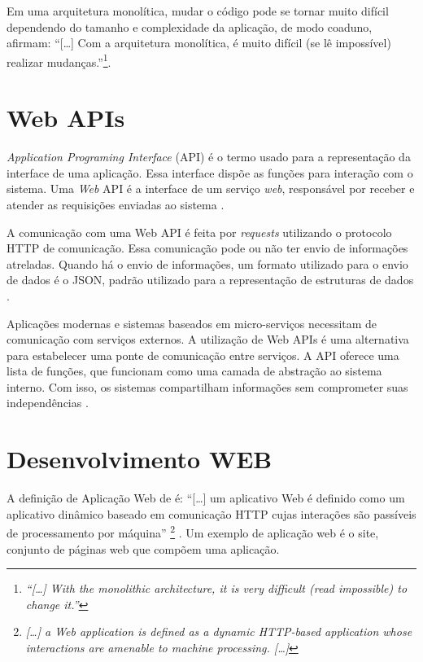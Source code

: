 Em uma arquitetura monolítica, mudar o código pode se tornar muito difícil dependendo do tamanho e complexidade da aplicação, de modo coaduno,  afirmam: ``[\dots] Com a arquitetura monolítica, é muito difícil (se lê impossível) realizar mudanças.''\cite[p.24, tradução nossa]{dmitry2014micro}\footnote{\textit{``[\dots] With the monolithic architecture, it is very difficult (read impossible) to change it.''}}.

\section{Web APIs}
\label{sec:apis}

\textit{Application Programing Interface} (API) é o termo usado para a representação da interface de uma aplicação. Essa interface dispõe as funções para interação com o sistema. Uma \textit{Web} API é a interface de um serviço \textit{web}, responsável por receber e atender as requisições enviadas ao sistema \cite{masse2011rest, richardson2013restful}.

A comunicação com uma Web API é feita por \textit{requests} utilizando o protocolo HTTP de comunicação. Essa comunicação pode ou não ter envio de informações atreladas. Quando há o envio de informações, um formato utilizado para o envio de dados é o JSON, padrão utilizado para a representação de estruturas de dados \cite{richardson2013restful}.

Aplicações modernas e sistemas baseados em micro-serviços necessitam de comunicação com serviços externos. A utilização de Web APIs é uma alternativa para estabelecer uma ponte de comunicação entre serviços. A API oferece uma lista de funções, que funcionam como uma camada de abstração ao sistema interno. Com isso, os sistemas compartilham informações sem comprometer suas independências \cite{ghebremicael2017transformation}.

\section {Desenvolvimento WEB}
\label{sec:desenvolvimentoWEB}

A definição de Aplicação Web de  é:
``[\dots] um aplicativo Web é definido como um aplicativo dinâmico baseado em comunicação HTTP cujas interações são passíveis de processamento por máquina'' \footnote{\textit{[\dots] a Web application is defined as a dynamic HTTP-based application whose
interactions are amenable to machine processing. [\dots]}} \cite[p.1, tradução nossa]{hadley2006web}. Um exemplo de aplicação web é o site, conjunto de páginas web que compõem uma aplicação.

